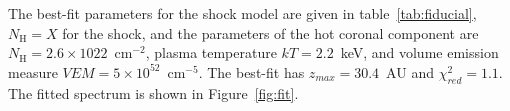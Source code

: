The best-fit parameters for the shock model are given in table~\ref{tab:fiducial}, $N_\textrm{H}=X$ for the shock, and the parameters of the hot coronal component are $N_\textrm{H}=2.6\times10{22}$~cm$^{-2}$, plasma temperature $kT = 2.2$~keV, and volume emission measure $VEM=5\times10^{52}$~cm$^{-5}$. The best-fit has $z_{max} = 30.4$~AU and $\chi^2_{red}= 1.1$. The fitted spectrum is shown in Figure~\ref{fig:fit}.
